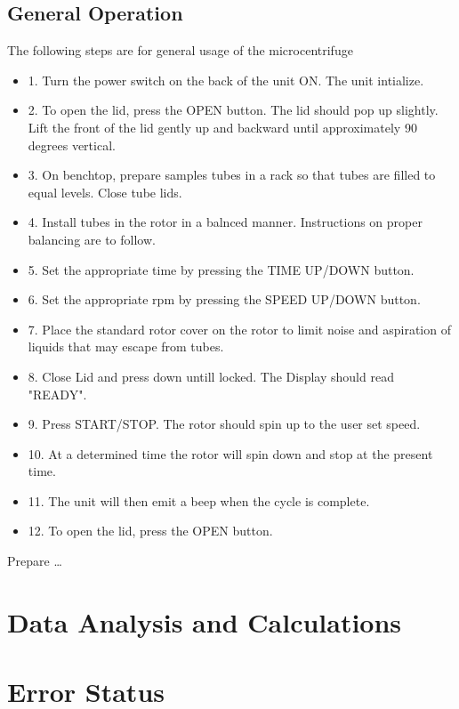 \documentclass[12pt]{../SOP3_beta}
\begin{document}
\subsection*{General Operation}

\NP The following steps are for general usage of the microcentrifuge

\begin{itemize}
  \item 1. Turn the power switch on the back of the unit ON. The unit intialize.
  \item 2. To open the lid, press the OPEN button. The lid should pop up slightly. Lift the front of the lid gently up and backward until approximately 90 degrees vertical.
  \item 3. On benchtop, prepare samples tubes in a rack so that tubes are filled to equal levels. Close tube lids.
  \item 4. Install tubes in the rotor in a balnced manner. Instructions on proper balancing are to follow.
  \item 5. Set the appropriate time by pressing the TIME UP/DOWN button.
  \item 6. Set the appropriate rpm by pressing the SPEED UP/DOWN button.
  \item 7. Place the standard rotor cover on the rotor to limit noise and aspiration of liquids that may escape from tubes.
  \item 8. Close Lid and press down untill locked. The Display should read "READY".
  \item 9. Press START/STOP. The rotor should spin up to the user set speed.
  \item 10. At a determined time the rotor will spin down and stop at the present time.
  \item 11. The unit will then emit a beep when the cycle is complete.
  \item 12. To open the lid, press the OPEN button.
\end{itemize}

\NP Prepare \dots

\NP

\section{Data Analysis and Calculations}

\section{Error Status}
\end{document}
